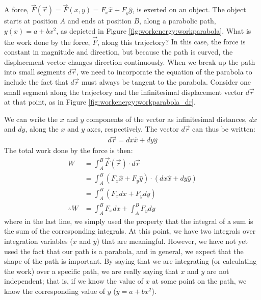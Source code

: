 \begin{example}{
A force, $\vec F(\vec r) = \vec F(x,y) = F_x\hat x + F_y \hat y$, is exerted on an object. The object starts at position $A$ and ends at position $B$, along a parabolic path, $y(x) = a+bx^2$, as depicted in Figure \ref{fig:workenergy:workparabola}. What is the work done by the force, $\vec F$, along this trajectory?}
In this case, the force is constant in magnitude and direction, but because the path is curved, the displacement vector changes direction continuously. When we break up the path into small segments $d\vec r$, we need to incorporate the equation of the parabola to include the fact that $d\vec r$ must always be tangent to the parabola. Consider one small segment along the trajectory and the infinitesimal displacement vector $d\vec r$ at that point, as in Figure \ref{fig:workenergy:workparabola_dr}.

We can write the $x$ and $y$ components of the vector as infinitesimal distances, $dx$ and $dy$, along the $x$ and $y$ axes, respectively. The vector $d\vec r$ can thus be written:
\begin{align*}
d\vec r = dx \hat x + dy \hat y
\end{align*}
The total work done by the force is then:
\begin{align*}
W &= \int_A^B \vec F(\vec r) \cdot d\vec r\\
&=\int_A^B (F_x\hat x + F_y \hat y) \cdot (dx \hat x + dy \hat y)\\
&=\int_A^B (F_x dx + F_ydy)\\
\therefore W&= \int_A^B F_x dx + \int_A^B F_ydy
\end{align*}
where in the last line, we simply used the property that the integral of a sum is the sum of the corresponding integrals. At this point, we have two integrals over integration variables ($x$ and $y$) that are meaningful. However, we have not yet used the fact that our path is a parabola, and in general, we expect that the shape of the path is important. By saying that we are integrating (or calculating the work) over a specific path, we are really saying that $x$ and $y$ are not independent; that is, if we know the value of $x$ at some point on the path, we know the corresponding value of $y$ ($y = a+bx^2$). 


\end{example}
